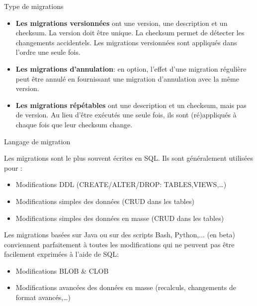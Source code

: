 \documentclass[slidestop,compress,11pt,xcolor=dvipsnames,french]{beamer}
\begin{document}
\begin{frame}{Type de migrations}

\begin{itemize}
 \item \textbf{Les migrations versionnées} ont une version, une description et un checksum. La version doit être unique. La checksum permet de détecter les changements accidentels. Les migrations versionnées sont appliqués dans l'ordre une seule fois. 
 \item \textbf{Les migrations d'annulation}: en option, l'effet d'une migration régulière peut être annulé en fournissant une migration d'annulation avec la même version. 
 \item \textbf{Les migrations répétables} ont une description et un checksum, mais pas de version. Au lieu d'être exécutés une seule fois, ils sont (ré)appliqués à chaque fois que leur checksum change. 

\end{itemize}
\end{frame}

\begin{frame}{Langage de migration}

Les migrations sont le plus souvent écrites en SQL. Ils sont généralement utilisées pour :

\begin{itemize}
\item Modifications DDL (CREATE/ALTER/DROP: TABLES,VIEWS,…)
\item Modifications simples des données (CRUD dans les tables)
\item Modifications simples des données en masse (CRUD dans les tables)
\end{itemize}

\vspace{1cm}

Les migrations basées sur Java ou sur des scripts Bash, Python,... (en beta) conviennent parfaitement à toutes les modifications qui ne peuvent pas être facilement exprimées à l'aide de SQL:
\begin{itemize}
 \item Modifications BLOB \& CLOB
 \item Modifications avancées des données en masse (recalculs, changements de format avancés,…)
\end{itemize}

\end{frame}
\end{document}
